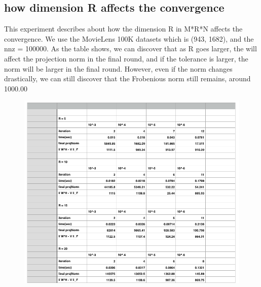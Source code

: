 \documentclass[12pt]{article}
\theoremstyle{remark}
\begin{document}
\begin{CJK}{UTF8}{bsmi}
\subsection{ how dimension R affects the convergence}
This experiment describes about how the dimension R in M*R*N affects the convergence. We use the MovieLens 100K datasets which is (943, 1682), and the nnz = 100000. 
As the table shows, we can discover that as R goes larger, the will affect the projection norm in the final round, and if the tolerance is larger, the norm will be larger in the final round. However, even if the norm changes drastically, we can still discover that the Frobenious norm still remains, around 1000.00
\begin{figure}[H]
    \begin{center}
        \includegraphics[width=500pt]{dimensionR.png}
        \label{fig:arch_02}
    \end{center}
\end{figure}


\end{CJK}
\end{document}
